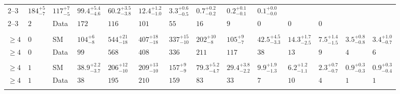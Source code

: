 \begin{landscape}
\begin{center}
\begin{table}[h!]
\begin{tabular}{ llllllllllllll }
    2--3                 & $184^{+5}_{-7}$                & $117^{+7}_{-5}$                & $99.4^{+5.4}_{-4.6}$           & $60.2^{+3.5}_{-3.8}$           & $12.4^{+1.2}_{-1.0}$           & $3.3^{+0.6}_{-0.5}$            & $0.7^{+0.2}_{-0.2}$            & $0.2^{+0.1}_{-0.1}$            & $0.1^{+0.0}_{-0.0}$            \\
    2--3                 & $2$      & Data & $172$                          & $116$                          & $101$                          & $55$                           & $16$                           & $9$                            & $0$                            & $0$                            & $0$                            \\ \\
    $\geq 4$             & $0$      & SM   & $104^{+6}_{-8}$                & $544^{+21}_{-18}$              & $407^{+18}_{-18}$              & $337^{+15}_{-10}$              & $202^{+10}_{-8}$               & $105^{+9}_{-7}$                & $42.5^{+4.5}_{-3.3}$           & $14.3^{+1.7}_{-2.5}$           & $7.5^{+1.4}_{-1.5}$            & $3.5^{+0.8}_{-0.8}$            & $3.4^{+1.0}_{-0.7}$            \\ 
    $\geq 4$             & $0$      & Data & $99$                           & $568$                          & $408$                          & $336$                          & $211$                          & $117$                          & $38$                           & $13$                           & $9$                            & $4$                            & $6$                            \\\\
    $\geq 4$             & $1$      & SM   & $38.9^{+2.2}_{-3.7}$           & $206^{+12}_{-10}$              & $209^{+13}_{-10}$              & $157^{+9}_{-9}$                & $79.3^{+5.2}_{-4.7}$           & $29.4^{+3.8}_{-2.2}$           & $9.9^{+1.9}_{-1.3}$            & $6.2^{+1.2}_{-1.1}$            & $2.3^{+0.7}_{-0.7}$            & $0.9^{+0.3}_{-0.3}$            & $0.9^{+0.3}_{-0.4}$            \\ 
    $\geq 4$             & $1$      & Data & $38$                           & $195$                          & $210$                          & $159$                          & $83$                           & $33$                           & $7$                            & $10$                           & $4$                            & $1$                            & $1$                            \\\\

\end{tabular}
\end{table}
\end{center}
\end{landscape}
